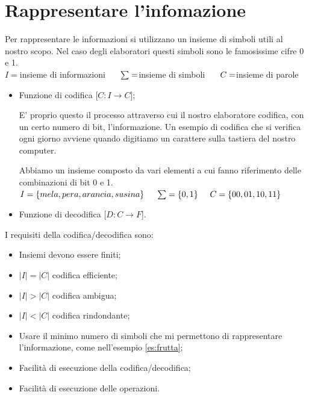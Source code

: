 \chapter{Rappresentare l'infomazione}
Per rappresentare le informazioni si utilizzano un insieme di simboli utili al nostro scopo. Nel caso degli elaboratori questi simboli sono le famosissime cifre 0 e 1.\\$I = $insieme di informazioni $\hspace{0,5cm} \sum = $insieme di simboli $\hspace{0,5cm} C = $insieme di parole
\begin{itemize}
    \item Funzione di codifica [$C: I\rightarrow C$];
    
    E' proprio questo il processo attraverso cui il nostro elaboratore codifica, con un certo numero di bit, l'informazione. Un esempio di codifica che si verifica ogni giorno avviene quando digitiamo un carattere sulla tastiera del nostro computer.
    
    \begin{example}
        \label{es:frutta} Abbiamo un insieme composto da vari elementi a cui fanno riferimento delle combinazioni di bit 0 e 1.\\ $I = \{mela, pera, arancia, susina\} \hspace{0,5cm} \sum = \{0,1\} \hspace{0,5cm} C = \{00,01,10,11\}$
    \end{example}

    \item Funzione di decodifica [$D: C\rightarrow F$].
\end{itemize}    
I requisiti della codifica/decodifica sono:
\begin{itemize}
    \item[-] Insiemi devono essere finiti;
    \item[-] $|I|=|C|$ codifica efficiente;
    \item[-] $|I|>|C|$ codifica ambigua;
    \item[-] $|I|<|C|$ codifica rindondante;
    \item[-] Usare il minimo numero di simboli che mi permettono di rappresentare l'informazione, come nell'esempio \ref{es:frutta};
    \item[-] Facilità di esecuzione della codifica/decodifica;
    \item[-] Facilità di esecuzione delle operazioni.
\end{itemize}


